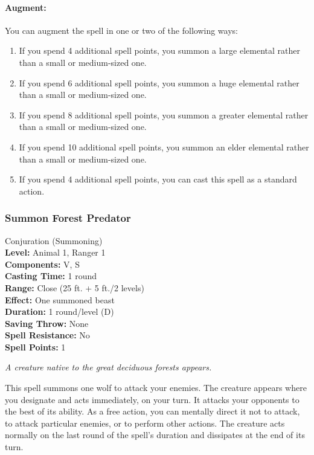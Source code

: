 \paragraph{Augment:} You can augment the spell in one or two of the following ways: 
\begin{enumerate}
 \item If you spend 4 additional spell points, you summon a large elemental rather than a small or medium-sized one.
 \item If you spend 6 additional spell points, you summon a huge elemental rather than a small or medium-sized one.
 \item If you spend 8 additional spell points, you summon a greater elemental rather than a small or medium-sized one.
 \item If you spend 10 additional spell points, you summon an elder elemental rather than a small or medium-sized one.
 \item If you spend 4 additional spell points, you can cast this spell as a standard action.
\end{enumerate}
\subsubsection{Summon Forest Predator}
\label{Spell:SummonForestPredator}
Conjuration (Summoning)
\\ \textbf{Level:} Animal 1, Ranger 1
\\ \textbf{Components:} V, S
\\ \textbf{Casting Time:} 1 round
\\ \textbf{Range:} Close (25 ft. + 5 ft./2 levels)
\\ \textbf{Effect:} One summoned beast
\\ \textbf{Duration:} 1 round/level (D)
\\ \textbf{Saving Throw:} None
\\ \textbf{Spell Resistance:} No
\\ \textbf{Spell Points:} 1

\emph{A creature native to the great deciduous forests appears.}

This spell summons one wolf to attack your enemies.
The creature appears where you designate and acts immediately, on your turn. 
It attacks your opponents to the best of its ability. 
As a free action, you can mentally direct it not to attack, to attack particular enemies, or to perform other actions. 
The creature acts normally on the last round of the spell's duration and dissipates at the end of its turn.

